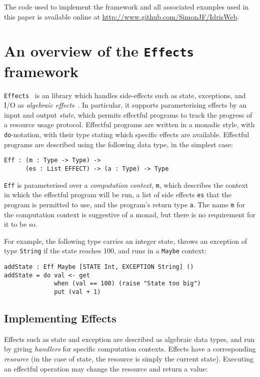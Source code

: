 \documentclass[preprint]{sigplanconf}
\begin{document}
The code used to implement the framework and all associated examples used in this paper is available online at \url{http://www.github.com/SimonJF/IdrisWeb}.

\section{An overview of the \texttt{Effects} framework}
\label{effects}

\texttt{Effects}~\cite{brady:effects} is an \idris{} library which handles
side-effects such as state, exceptions, and I/O as \emph{algebraic
effects}~\cite{Plotkin2009}. In particular, it supports parameterising effects
by an input and output \emph{state}, which permits effectful programs to track
the progress of a resource usage protocol. Effectful programs are written
in a monadic style, with \texttt{do}-notation, with their type stating which
specific effects are available.
Effectful
programs are described using the following data type,
in the simplest case:

\begin{Verbatim}
Eff : (m : Type -> Type) ->
      (es : List EFFECT) -> (a : Type) -> Type
\end{Verbatim}

\texttt{Eff} is parameterised over a \emph{computation context}, \texttt{m}, 
which describes the context in which the effectful program will be run, a
list of side effects \texttt{es} that the program is permitted to use, and the
program’s return type \texttt{a}. The name \texttt{m} for the computation context is
suggestive of a monad, but there is no requirement for it to be so.

For example, the following type carries an integer state,
throws an exception of type \texttt{String} if the state reaches 100, 
and runs in a \texttt{Maybe} context:

\begin{Verbatim}
addState : Eff Maybe [STATE Int, EXCEPTION String] ()
addState = do val <- get
              when (val == 100) (raise "State too big")
              put (val + 1)
\end{Verbatim}

\subsection{Implementing Effects}

Effects such as state and exception are described as algebraic data types,
and run by giving \emph{handlers} for specific computation contexts. 
Effects have a corresponding \emph{resource} (in the case of state, the
resource is simply the current state). Executing an effectful operation may
change the resource and return a value:
\end{document}
